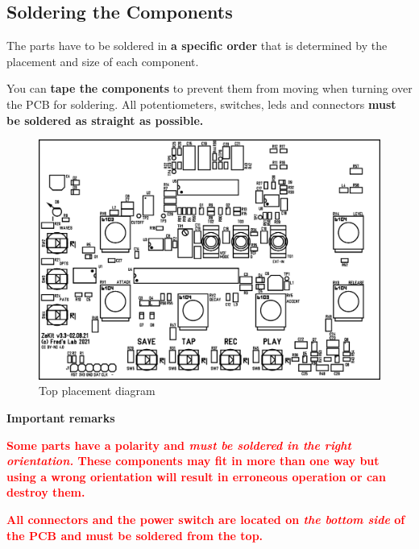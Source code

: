 \documentclass{scrartcl}
\begin{document}
\pagebreak
\subsection{Soldering the Components}

The parts have to be soldered in \textbf{a specific order} that is determined by the placement and size of each component.

You can \textbf{tape the components} to prevent them from moving when turning over the PCB for soldering.
All potentiometers, switches, leds and connectors \textbf{must be soldered as straight as possible.}

\begin{figure}[!ht]
    \begin{center}
        \includegraphics[scale=0.70]{assets/pcb-top.png}
        \caption{Top placement diagram}
    \end{center}
\end{figure}

\vspace{0.25cm}

\textbf{Important remarks}

\begin{tcolorbox}
    \textcolor{red}{
        \textbf{Some parts have a polarity and \emph{must be soldered in the right orientation.} These components may fit in more than one way but using a wrong orientation will result in erroneous operation or can destroy them.}
    }
\end{tcolorbox}

\vspace{0.25cm}

\begin{tcolorbox}
    \textcolor{red}{
        \textbf{All connectors and the power switch are located on \emph{the bottom side} of the PCB and must be soldered from the top.}
    }
\end{tcolorbox}
\end{document}
